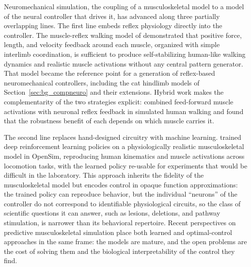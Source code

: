 Neuromechanical simulation, the coupling of a musculoskeletal model to a model of the neural controller that drives it, has advanced along three partially overlapping lines. The first line embeds reflex physiology directly into the controller. The muscle-reflex walking model of \citet{geyer_musclereflex_2010} demonstrated that positive force, length, and velocity feedback around each muscle, organized with simple interlimb coordination, is sufficient to produce self-stabilizing human-like walking dynamics and realistic muscle activations without any central pattern generator. That model became the reference point for a generation of reflex-based neuromechanical controllers, including the cat hindlimb models of Section~\ref{sec:bg_compneuro} \citep{markin_afferent_2010, shevtsova_modeling_2016} and their extensions. Hybrid work makes the complementarity of the two strategies explicit: \citet{haeufle_benefit_2018} combined feed-forward muscle activations with neuronal reflex feedback in simulated human walking and found that the robustness benefit of each depends on which muscle carries it.

The second line replaces hand-designed circuitry with machine learning. \citet{song_deep_2021} trained deep reinforcement learning policies on a physiologically realistic musculoskeletal model in OpenSim, reproducing human kinematics and muscle activations across locomotion tasks, with the learned policy re-usable for experiments that would be difficult in the laboratory. This approach inherits the fidelity of the musculoskeletal model but encodes control in opaque function approximations: the trained policy can reproduce behavior, but the individual ``neurons'' of the controller do not correspond to identifiable physiological circuits, so the class of scientific questions it can answer, such as lesions, deletions, and pathway stimulation, is narrower than its behavioral repertoire. Recent perspectives on predictive musculoskeletal simulation \citep{degroote_perspective_2021} place both learned and optimal-control approaches in the same frame: the models are mature, and the open problems are the cost of solving them and the biological interpretability of the control they find.

